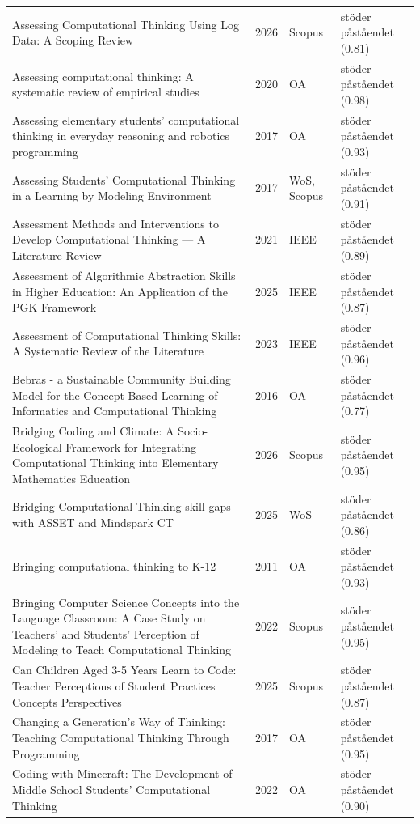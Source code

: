\begin{longtable}{@{}%
  >{\raggedright\arraybackslash}p{}c%
  >{\raggedright\arraybackslash}p{}%
  >{\raggedright\arraybackslash}p{}@{}}
Assessing Computational Thinking Using Log Data: A Scoping Review & 2026 & Scopus & stöder påståendet (0.81) \\
Assessing computational thinking: A systematic review of empirical studies & 2020 & OA & stöder påståendet (0.98) \\
Assessing elementary students' computational thinking in everyday reasoning and robotics programming & 2017 & OA & stöder påståendet (0.93) \\
Assessing Students' Computational Thinking in a Learning by Modeling Environment & 2017 & WoS, Scopus & stöder påståendet (0.91) \\
Assessment Methods and Interventions to Develop Computational Thinking --- A Literature Review & 2021 & IEEE & stöder påståendet (0.89) \\
Assessment of Algorithmic Abstraction Skills in Higher Education: An Application of the PGK Framework & 2025 & IEEE & stöder påståendet (0.87) \\
Assessment of Computational Thinking Skills: A Systematic Review of the Literature & 2023 & IEEE & stöder påståendet (0.96) \\
Bebras - a Sustainable Community Building Model for the Concept Based Learning of Informatics and Computational Thinking & 2016 & OA & stöder påståendet (0.77) \\
Bridging Coding and Climate: A Socio-Ecological Framework for Integrating Computational Thinking into Elementary Mathematics Education & 2026 & Scopus & stöder påståendet (0.95) \\
Bridging Computational Thinking skill gaps with ASSET and Mindspark CT & 2025 & WoS & stöder påståendet (0.86) \\
Bringing computational thinking to K-12 & 2011 & OA & stöder påståendet (0.93) \\
Bringing Computer Science Concepts into the Language Classroom: A Case Study on Teachers' and Students' Perception of Modeling to Teach Computational Thinking & 2022 & Scopus & stöder påståendet (0.95) \\
Can Children Aged 3-5 Years Learn to Code: Teacher Perceptions of Student Practices Concepts Perspectives & 2025 & Scopus & stöder påståendet (0.87) \\
Changing a Generation's Way of Thinking: Teaching Computational Thinking Through Programming & 2017 & OA & stöder påståendet (0.95) \\
Coding with Minecraft: The Development of Middle School Students' Computational Thinking & 2022 & OA & stöder påståendet (0.90) \\

\end{longtable}
